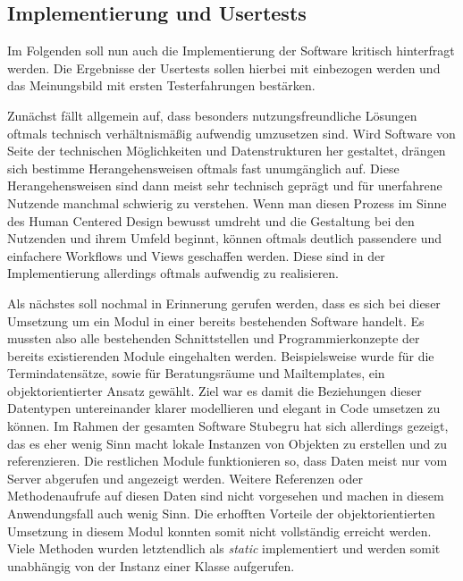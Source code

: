 \subsection*{Implementierung und Usertests}

Im Folgenden soll nun auch die Implementierung der Software kritisch
hinterfragt werden. Die Ergebnisse der Usertests sollen hierbei mit einbezogen
werden und das Meinungsbild mit ersten Testerfahrungen bestärken.

Zunächst fällt allgemein auf, dass besonders nutzungsfreundliche Lösungen
oftmals technisch verhältnismäßig aufwendig umzusetzen sind. Wird Software von
Seite der technischen Möglichkeiten und Datenstrukturen her gestaltet, drängen
sich bestimme Herangehensweisen oftmals fast unumgänglich auf. Diese
Herangehensweisen sind dann meist sehr technisch geprägt und für unerfahrene
Nutzende manchmal schwierig zu verstehen. Wenn man diesen Prozess im Sinne des
Human Centered Design bewusst umdreht und die Gestaltung bei den Nutzenden und
ihrem Umfeld beginnt, können oftmals deutlich passendere und einfachere
Workflows und Views geschaffen werden. Diese sind in der Implementierung
allerdings oftmals aufwendig zu realisieren.

Als nächstes soll nochmal in Erinnerung gerufen werden, dass es sich bei dieser
Umsetzung um ein Modul in einer bereits bestehenden Software handelt. Es
mussten also alle bestehenden Schnittstellen und Programmierkonzepte der
bereits existierenden Module eingehalten werden. Beispielsweise wurde für die
Termindatensätze, sowie für Beratungsräume und Mailtemplates, ein
objektorientierter Ansatz gewählt. Ziel war es damit die Beziehungen dieser
Datentypen untereinander klarer modellieren und elegant in Code umsetzen zu
können. Im Rahmen der gesamten Software Stubegru hat sich allerdings gezeigt,
das es eher wenig Sinn macht lokale Instanzen von Objekten zu erstellen und zu
referenzieren. Die restlichen Module funktionieren so, dass Daten meist nur vom
Server abgerufen und angezeigt werden. Weitere Referenzen oder Methodenaufrufe
auf diesen Daten sind nicht vorgesehen und machen in diesem Anwendungsfall auch
wenig Sinn. Die erhofften Vorteile der objektorientierten Umsetzung in diesem
Modul konnten somit nicht vollständig erreicht werden. Viele Methoden wurden
letztendlich als \textit{static} implementiert und werden somit unabhängig von
der Instanz einer Klasse aufgerufen.

